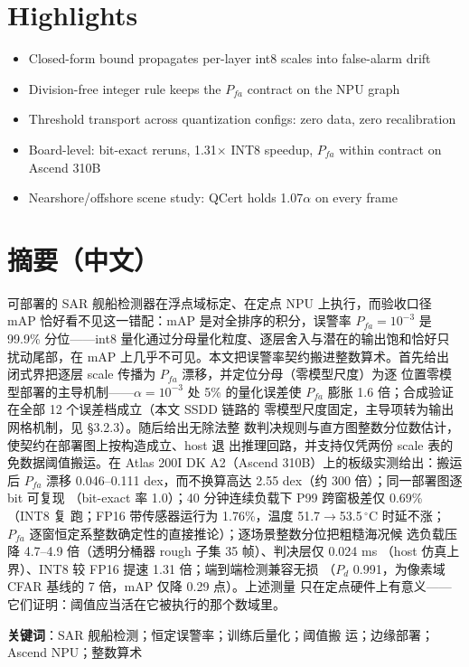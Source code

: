 \documentclass[preprint,12pt]{elsarticle}
\begin{document}
\section*{Highlights}
\begin{itemize}
\item Closed-form bound propagates per-layer int8 scales into false-alarm drift
\item Division-free integer rule keeps the $P_{fa}$ contract on the NPU graph
\item Threshold transport across quantization configs: zero data, zero recalibration
\item Board-level: bit-exact reruns, 1.31$\times$ INT8 speedup, $P_{fa}$ within
      contract on Ascend 310B
\item Nearshore/offshore scene study: QCert holds 1.07$\alpha$ on every frame
\end{itemize}

\section*{摘要（中文）}
可部署的 SAR 舰船检测器在浮点域标定、在定点 NPU 上执行，而验收口径 mAP
恰好看不见这一错配：mAP 是对全排序的积分，误警率 $P_{fa}=10^{-3}$ 是
99.9\% 分位——int8 量化通过分母量化粒度、逐层舍入与潜在的输出饱和恰好只
扰动尾部，在 mAP 上几乎不可见。本文把误警率契约搬进整数算术。首先给出
闭式界把逐层 scale 传播为 $P_{fa}$ 漂移，并定位分母（零模型尺度）为逐
位置零模型部署的主导机制——$\alpha=10^{-3}$ 处 5\% 的量化误差使
$P_{fa}$ 膨胀 1.6 倍；合成验证在全部 12 个误差档成立（本文 SSDD 链路的
零模型尺度固定，主导项转为输出网格机制，见 \S3.2.3）。随后给出无除法整
数判决规则与直方图整数分位数估计，使契约在部署图上按构造成立、host 退
出推理回路，并支持仅凭两份 scale 表的免数据阈值搬运。在 Atlas 200I DK
A2（Ascend 310B）上的板级实测给出：搬运后 $P_{fa}$ 漂移 0.046--0.111
dex，而不换算高达 2.55 dex（约 300 倍）；同一部署图逐 bit 可复现
（bit-exact 率 1.0）；40 分钟连续负载下 P99 跨窗极差仅 0.69\%（INT8 复
跑；FP16 带传感器运行为 1.76\%，温度 51.7$\to$53.5\,$^\circ$C 时延不涨；
$P_{fa}$ 逐窗恒定系整数确定性的直接推论）；逐场景整数分位把粗糙海况候
选负载压降 4.7--4.9 倍（透明分桶器 rough 子集 35 帧）、判决层仅 0.024 ms
（host 仿真上界）、INT8 较 FP16 提速 1.31 倍；端到端检测兼容无损
（$P_d$ 0.991，为像素域 CFAR 基线的 7 倍，mAP 仅降 0.29 点）。上述测量
只在定点硬件上有意义——它们证明：阈值应当活在它被执行的那个数域里。

\medskip
\noindent\textbf{关键词}：SAR 舰船检测；恒定误警率；训练后量化；阈值搬
运；边缘部署；Ascend NPU；整数算术

\bigskip


\end{document}
